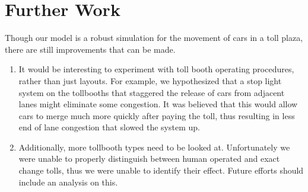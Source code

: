 \documentclass{article}
\begin{document}
\section{Further Work}
Though our model is a robust simulation for the movement of cars in a toll plaza, there are still improvements that can be made.
\begin{enumerate}
\item It would be interesting to experiment with toll booth operating procedures, rather than just layouts. For example, we hypothesized that a stop light system on the tollbooths that staggered the release of cars from adjacent lanes might eliminate some congestion. It was believed that this would allow cars to merge much more quickly after paying the toll, thus resulting in less end of lane congestion that slowed the system up.
\item Additionally, more tollbooth types need to be looked at. Unfortunately we were unable to properly distinguish between human operated and exact change tolls, thus we were unable to identify their effect. Future efforts should include an analysis on this.
\end{enumerate}


\pagebreak

\newpage
\end{document}
